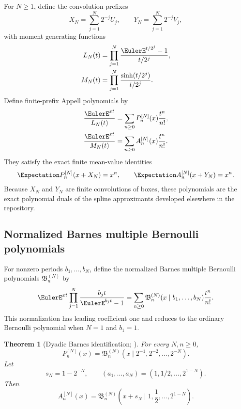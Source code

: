 \documentclass[11pt,oneside]{article}
\numberwithin{equation}{section}
\newtheorem{theorem}{Theorem}[section]
\theoremstyle{definition}
\theoremstyle{remark}
\begin{document}
For $N\ge1$, define the convolution prefixes
\begin{equation}
 X_N=\sum_{j=1}^{N}2^{-j}U_j,
 \qquad
 Y_N=\sum_{j=1}^{N}2^{-j}V_j,
 \label{p2:eq:finite-XY}
\end{equation}
with moment generating functions
\begin{align}
 L_N(t)&=\prod_{j=1}^{N}\frac{\EulerE^{t/2^j}-1}{t/2^j},
 \label{p2:eq:LN}\\
 M_N(t)&=\prod_{j=1}^{N}\frac{\sinh(t/2^j)}{t/2^j}.
 \label{p2:eq:MN}
\end{align}
Define finite-prefix Appell polynomials by
\begin{align}
 \frac{\EulerE^{xt}}{L_N(t)}
 &=\sum_{n\ge0}P_n^{[N]}(x)\frac{t^n}{n!},
 \label{p2:eq:PN-generating}\\
 \frac{\EulerE^{xt}}{M_N(t)}
 &=\sum_{n\ge0}A_n^{[N]}(x)\frac{t^n}{n!}.
 \label{p2:eq:AN-generating}
\end{align}
They satisfy the exact finite mean-value identities
\begin{equation}
 \Expectation P_n^{[N]}(x+X_N)=x^n,
 \qquad
 \Expectation A_n^{[N]}(x+Y_N)=x^n.
 \label{p2:eq:finite-mean-value}
\end{equation}
Because $X_N$ and $Y_N$ are finite convolutions of boxes, these polynomials are the exact
polynomial duals of the spline approximants developed elsewhere in the repository.

\subsection{Normalized Barnes multiple Bernoulli polynomials}

For nonzero periods $b_1,\ldots,b_N$, define the normalized Barnes multiple Bernoulli polynomials
$\mathfrak B_n^{(N)}$ by
\begin{equation}
 \EulerE^{xt}\prod_{j=1}^{N}\frac{b_jt}{\EulerE^{b_jt}-1}
 =\sum_{n\ge0}
 \mathfrak B_n^{(N)}(x\mid b_1,\ldots,b_N)\frac{t^n}{n!}.
 \label{p2:eq:Barnes-def}
\end{equation}
This normalization has leading coefficient one and reduces to the ordinary Bernoulli polynomial
when $N=1$ and $b_1=1$.

\begin{theorem}[Dyadic Barnes identification; \statusnew]
\label{p2:thm:Barnes-identification}
For every $N,n\ge0$,
\begin{equation}
 \boxed{
 P_n^{[N]}(x)
 =\mathfrak B_n^{(N)}
 \left(x\mid 2^{-1},2^{-2},\ldots,2^{-N}\right).
 }
 \label{p2:eq:P-Barnes}
\end{equation}
Let
\begin{equation}
 s_N=1-2^{-N},
 \qquad
 (a_1,\ldots,a_N)=(1,1/2,\ldots,2^{1-N}).
 \label{p2:eq:a-sN}
\end{equation}
Then
\begin{equation}
 \boxed{
 A_n^{[N]}(x)
 =\mathfrak B_n^{(N)}
 \left(x+s_N\mid1,\frac12,\ldots,2^{1-N}\right).
 }
 \label{p2:eq:A-Barnes}
\end{equation}
\end{theorem}
\end{document}
